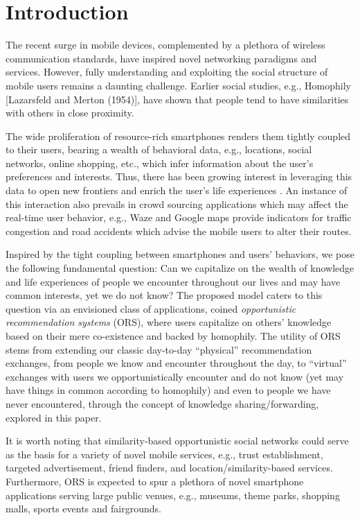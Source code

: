 \documentclass[conference]{IEEEtran}
\theoremstyle{definition}
\begin{document}
\section{Introduction}
The recent surge in mobile devices, complemented by a plethora of wireless 
communication standards, have inspired novel networking paradigms and services.
However, fully understanding and exploiting the social structure of 
mobile users remains a daunting challenge. Earlier
social studies, e.g., Homophily {[}Lazarsfeld and Merton (1954){]},
have shown that people tend to have similarities with others in close
proximity. 


The wide proliferation of resource-rich smartphones renders them tightly coupled to their users, bearing a wealth of behavioral data, e.g., locations, social networks, online shopping, etc., which infer information about the user's preferences and interests. Thus, there has been growing interest in leveraging this data to open new frontiers and enrich the user's life experiences \cite{Eagle}. An instance of this interaction also prevails in crowd sourcing applications which may affect the real-time user behavior, e.g., Waze and Google maps provide indicators for traffic congestion and road accidents which advise the mobile users to alter their routes.

Inspired by the tight coupling between smartphones and users' behaviors, we pose the following fundamental question: Can we capitalize on the wealth of knowledge and life experiences of people we encounter throughout our lives and may have common interests, yet we do not know? The proposed model caters to this question via an envisioned class of applications, coined {\it opportunistic recommendation systems} (ORS), where users capitalize on others' knowledge based on their mere co-existence and backed by homophily. The utility of ORS stems from extending our classic day-to-day ``physical'' recommendation exchanges, from people we know and encounter throughout the day, to ``virtual'' exchanges with users we opportunistically encounter and do not know (yet may have things in common according to homophily) and even to people we have never encountered, through the concept of knowledge sharing/forwarding, explored in this paper.

It is worth noting that similarity-based opportunistic social networks could serve as the basis for a variety of novel mobile services, e.g., trust establishment, targeted advertisement, friend finders, and location/similarity-based services. Furthermore, ORS is expected to spur a plethora of novel smartphone applications serving large public venues, e.g., museums, theme parks, shopping malls, sports events and fairgrounds.
\end{document}
